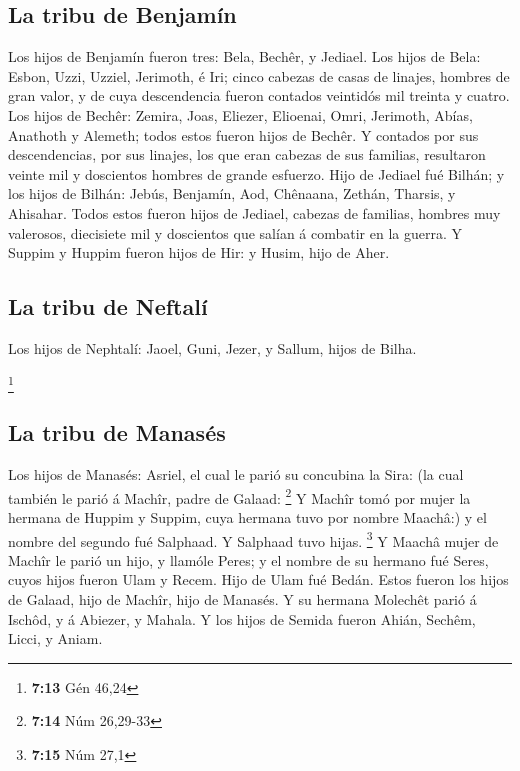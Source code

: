 \hypertarget{la-tribu-de-benjamuxedn}{%
\subsection{La tribu de Benjamín}\label{la-tribu-de-benjamuxedn}}

 Los hijos de Benjamín fueron tres: Bela, Bechêr, y Jediael.
 Los hijos de Bela: Esbon, Uzzi, Uzziel, Jerimoth, é Iri;
cinco cabezas de casas de linajes, hombres de gran valor, y de cuya
descendencia fueron contados veintidós mil treinta y cuatro.
 Los hijos de Bechêr: Zemira, Joas, Eliezer, Elioenai, Omri,
Jerimoth, Abías, Anathoth y Alemeth; todos estos fueron hijos de Bechêr.
 Y contados por sus descendencias, por sus linajes, los que
eran cabezas de sus familias, resultaron veinte mil y doscientos hombres
de grande esfuerzo.  Hijo de Jediael fué Bilhán; y los
hijos de Bilhán: Jebús, Benjamín, Aod, Chênaana, Zethán, Tharsis, y
Ahisahar.  Todos estos fueron hijos de Jediael, cabezas de
familias, hombres muy valerosos, diecisiete mil y doscientos que salían
á combatir en la guerra.  Y Suppim y Huppim fueron hijos de
Hir: y Husim, hijo de Aher.

\hypertarget{la-tribu-de-neftaluxed}{%
\subsection{La tribu de Neftalí}\label{la-tribu-de-neftaluxed}}

 Los hijos de Nephtalí: Jaoel, Guni, Jezer, y Sallum, hijos
de Bilha.

\footnote{\textbf{7:13} Gén 46,24}

\hypertarget{la-tribu-de-manasuxe9s}{%
\subsection{La tribu de Manasés}\label{la-tribu-de-manasuxe9s}}

 Los hijos de Manasés: Asriel, el cual le parió su
concubina la Sira: (la cual también le parió á Machîr, padre de Galaad:
\footnote{\textbf{7:14} Núm 26,29-33}  Y Machîr tomó por
mujer la hermana de Huppim y Suppim, cuya hermana tuvo por nombre
Maachâ:) y el nombre del segundo fué Salphaad. Y Salphaad tuvo hijas.
\footnote{\textbf{7:15} Núm 27,1}  Y Maachâ mujer de Machîr
le parió un hijo, y llamóle Peres; y el nombre de su hermano fué Seres,
cuyos hijos fueron Ulam y Recem.  Hijo de Ulam fué Bedán.
Estos fueron los hijos de Galaad, hijo de Machîr, hijo de Manasés.
 Y su hermana Molechêt parió á Ischôd, y á Abiezer, y
Mahala.  Y los hijos de Semida fueron Ahián, Sechêm, Licci,
y Aniam.

